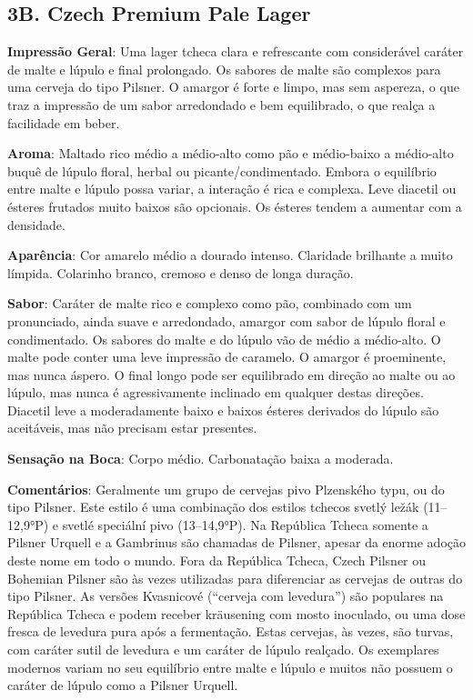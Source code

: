 \subsection*{3B. Czech Premium Pale Lager}

\textbf{Impressão Geral}: Uma lager tcheca clara e refrescante com considerável caráter de malte e lúpulo e final prolongado. Os sabores de malte são complexos para uma cerveja do tipo Pilsner. O amargor é forte e limpo, mas sem aspereza, o que traz a impressão de um sabor arredondado e bem equilibrado, o que realça a facilidade em beber.

\textbf{Aroma}: Maltado rico médio a médio-alto como pão e médio-baixo a médio-alto buquê de lúpulo floral, herbal ou picante/condimentado. Embora o equilíbrio entre malte e lúpulo possa variar, a interação é rica e complexa. Leve diacetil ou ésteres frutados muito baixos são opcionais. Os ésteres tendem a aumentar com a densidade.

\textbf{Aparência}: Cor amarelo médio a dourado intenso. Claridade brilhante a muito límpida. Colarinho branco, cremoso e denso de longa duração.

\textbf{Sabor}: Caráter de malte rico e complexo como pão, combinado com um pronunciado, ainda suave e arredondado, amargor com sabor de lúpulo floral e condimentado. Os sabores do malte e do lúpulo vão de médio a médio-alto. O malte pode conter uma leve impressão de caramelo. O amargor é proeminente, mas nunca áspero. O final longo pode ser equilibrado em direção ao malte ou ao lúpulo, mas nunca é agressivamente inclinado em qualquer destas direções. Diacetil leve a moderadamente baixo e baixos ésteres derivados do lúpulo são aceitáveis, mas não precisam estar presentes.

\textbf{Sensação na Boca}: Corpo médio. Carbonatação baixa a moderada.

\textbf{Comentários}: Geralmente um grupo de cervejas pivo Plzenského typu, ou do tipo Pilsner. Este estilo é uma combinação dos estilos tchecos svetlý ležák (11–12,9°P) e svetlé speciální pivo (13–14,9°P). Na República Tcheca somente a Pilsner Urquell e a Gambrinus são chamadas de Pilsner, apesar da enorme adoção deste nome em todo o mundo. Fora da República Tcheca, Czech Pilsner ou Bohemian Pilsner são às vezes utilizadas para diferenciar as cervejas de outras do tipo Pilsner. As versões Kvasnicové (“cerveja com levedura”) são populares na República Tcheca e podem receber kräusening com mosto inoculado, ou uma dose fresca de levedura pura após a fermentação. Estas cervejas, às vezes, são turvas, com caráter sutil de levedura e um caráter de lúpulo realçado. Os exemplares modernos variam no seu equilíbrio entre malte e lúpulo e muitos não possuem o caráter de lúpulo como a Pilsner Urquell.

